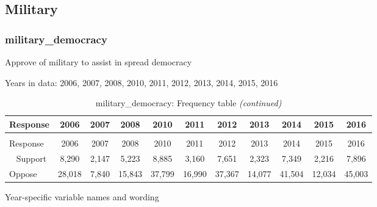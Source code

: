 \documentclass[12pt]{article}
\begin{document}
\subsection{Military}\label{military}

\subsubsection{military\_democracy}\label{military_democracy}

Approve of military to assist in spread democracy

Years in data: 2006, 2007, 2008, 2010, 2011, 2012, 2013, 2014, 2015,
2016\begingroup\fontsize{10}{12}\selectfont

\begin{longtable}[t]{lcccccccccc}
\caption{\label{tab:unnamed-chunk-4}military\_democracy: Frequency table}\\
\toprule
Response & 2006 & 2007 & 2008 & 2010 & 2011 & 2012 & 2013 & 2014 & 2015 & 2016\\
\midrule
\endfirsthead
\caption[]{military\_democracy: Frequency table \textit{(continued)}}\\
\toprule
Response & 2006 & 2007 & 2008 & 2010 & 2011 & 2012 & 2013 & 2014 & 2015 & 2016\\
\midrule
\endhead
\
\endfoot
\bottomrule
\endlastfoot
Support & 8,290 & 2,147 & 5,223 & 8,885 & 3,160 & 7,651 & 2,323 & 7,349 & 2,216 & 7,896\\
Oppose & 28,018 & 7,840 & 15,843 & 37,799 & 16,990 & 37,367 & 14,077 & 41,504 & 12,034 & 45,003\\*
\end{longtable}

\endgroup{}

Year-specific variable names and wording
\end{document}
